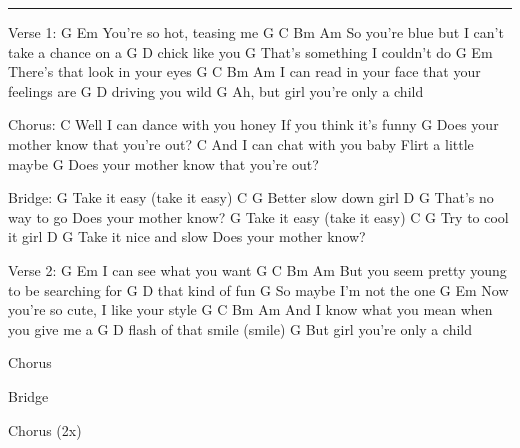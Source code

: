 \noindent\rule{\columnwidth}{1pt}

\begin{multicols}{2}
\begin{lstsong}
Verse 1:
G                      Em
You're so hot, teasing me
G         C          Bm           Am
So you're blue but I can't take a chance on a 
G          D
chick like you
                               G
That's something I couldn't do
G                         Em
There's that look in your eyes
G     C            Bm             Am
I can read in your face that your feelings are
G           D
driving you wild
                                 G
Ah, but girl you're only a child

Chorus:
C
Well I can dance with you honey
If you think it's funny
                                  G
Does your mother know that you're out?
C
And I can chat with you baby
Flirt a little maybe
                                  G
Does your mother know that you're out?

Bridge:
G
Take it easy (take it easy)
       C         G
Better slow down girl
       D        G
That's no way to go
Does your mother know?
G
Take it easy (take it easy)
       C       G
Try to cool it girl
        D        G
Take it nice and slow
Does your mother know?

Verse 2:
G                  Em
I can see what you want
G       C           Bm          Am
But you seem pretty young to be searching for
G           D
that kind of fun
                        G
So maybe I'm not the one
G                               Em
Now you're so cute, I like your style
G     C             Bm            Am
And I know what you mean when you give me a
G             D
flash of that smile (smile)
                             G
But girl you're only a child

Chorus

Bridge

Chorus (2x)
\end{lstsong}
\end{multicols}
\newpage

